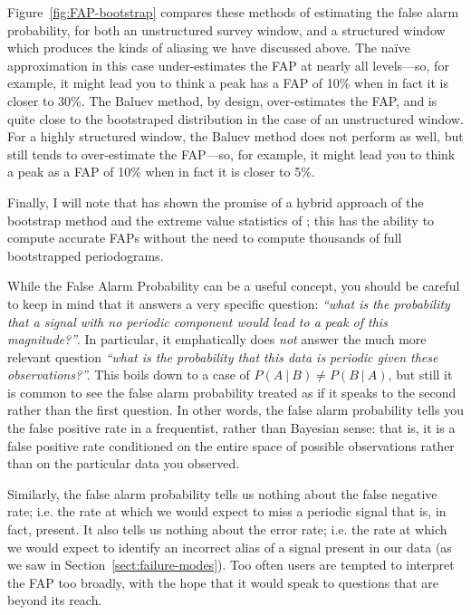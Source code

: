 \documentclass[preprint]{aastex}
\newcommand{\fig}[1]{Figure~\ref{fig:#1}}
\newcommand{\Sect}[1]{Section~\ref{sect:#1}}
\newcommand{\sect}[1]{\Sect{#1}}
\begin{document}
\fig{FAP-bootstrap} compares these methods of estimating the false alarm
probability, for both an unstructured survey window, and a structured window
which produces the kinds of aliasing we have discussed above.
The na{\"i}ve approximation in this case under-estimates the FAP at nearly all
levels---so, for example, it might lead you to think a peak has a FAP of 10\%
when in fact it is closer to 30\%.
The Baluev method, by design, over-estimates the FAP, and is quite close to
the bootstraped distribution in the case of an unstructured window.
For a highly structured window, the Baluev method does not perform as well,
but still tends to over-estimate the FAP---so, for example, it might lead you
to think a peak as a FAP of 10\% when in fact it is closer to 5\%.

Finally, I will note that \citet{Suveges12} has shown the promise of a
hybrid approach of the bootstrap method and the extreme value statistics
of \citet{Baluev2008}; this has the ability to compute accurate FAPs
without the need to compute thousands of full bootstrapped periodograms.


While the False Alarm Probability can be a useful concept, you should be
careful to keep in mind that it answers a very specific question:
{\it ``what is the probability that a signal with no periodic component would
  lead to a peak of this magnitude?''}.
In particular, it emphatically does {\it not} answer the much more relevant
question {\it ``what is the probability that this data is periodic
  given these observations?''.}
This boils down to a case of $P(A~|~B) \ne P(B~|~A)$, but still it is common to
see the false alarm probability treated as if it speaks to the second rather
than the first question.
In other words, the false alarm probability tells you the false positive rate
in a frequentist, rather than Bayesian sense: that is, it is a false positive
rate conditioned on the entire space of possible observations rather than on
the particular data you observed.

Similarly, the false alarm probability tells us nothing about the false
negative rate; {i.e.} the rate at which
we would expect to miss a periodic signal that is, in fact, present.
It also tells us nothing about the error rate; {i.e.} the rate at which we
would expect to identify an incorrect alias of a signal present in our data
(as we saw in \sect{failure-modes}).
Too often users are tempted to interpret the FAP too broadly, with the hope that
it would speak to questions that are beyond its reach.
\end{document}
